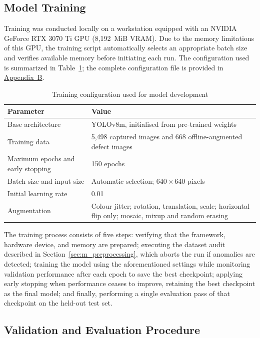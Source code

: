 \subsection{Model Training}
\label{sec:m_training}

Training was conducted locally on a workstation equipped with an NVIDIA GeForce RTX 3070 Ti \acrshort{GPU} (8{,}192~\acrshort{MiB} \acrshort{VRAM}). Due to the memory limitations of this GPU, the training script automatically selects an appropriate batch size and verifies available memory before initiating each run. The configuration used is summarized in Table~\ref{tab:training}; the complete configuration file is provided in \hyperref[app:B]{Appendix~B}.

\begin{table}[H]
\caption{Training configuration used for model development}
\label{tab:training}
\centering
\begin{tabularx}{\textwidth}{p{5.4cm} X}
\toprule
\textbf{Parameter} & \textbf{Value} \\
\midrule
Base architecture & YOLOv8m, initialised from pre-trained weights \\
Training data & 5{,}498 captured images and 668 offline-augmented defect images \\
Maximum epochs and early stopping & 150 epochs\\
Batch size and input size & Automatic selection; 640\,$\times$\,640 pixels \\
Initial learning rate & 0.01 \\
Augmentation & Colour jitter; rotation, translation, scale; horizontal flip only; mosaic, mixup and random erasing \\
\bottomrule
\end{tabularx}
\end{table}

The training process consists of five steps: verifying that the framework, hardware device, and memory are prepared; executing the dataset audit described in Section~\ref{sec:m_preprocessing}, which aborts the run if anomalies are detected; training the model using the aforementioned settings while monitoring validation performance after each epoch to save the best checkpoint; applying early stopping when performance ceases to improve, retaining the best checkpoint as the final model; and finally, performing a single evaluation pass of that checkpoint on the held-out test set.

\subsection{Validation and Evaluation Procedure}
\label{sec:m_evaluation}

